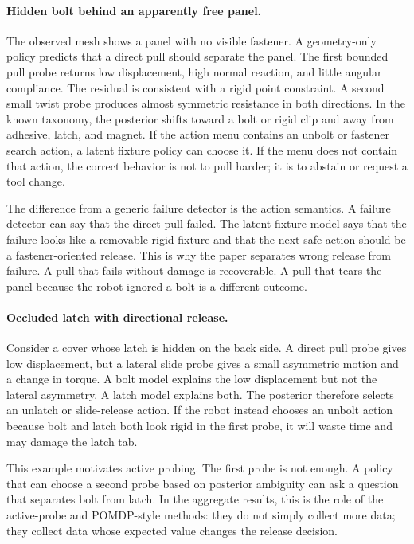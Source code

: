 \documentclass{article}
\begin{document}
\paragraph{Hidden bolt behind an apparently free panel.}
The observed mesh shows a panel with no visible fastener. A geometry-only
policy predicts that a direct pull should separate the panel. The first bounded
pull probe returns low displacement, high normal reaction, and little angular
compliance. The residual is consistent with a rigid point constraint. A second
small twist probe produces almost symmetric resistance in both directions. In
the known taxonomy, the posterior shifts toward a bolt or rigid clip and away
from adhesive, latch, and magnet. If the action menu contains an unbolt or
fastener search action, a latent fixture policy can choose it. If the menu does
not contain that action, the correct behavior is not to pull harder; it is to
abstain or request a tool change.

The difference from a generic failure detector is the action semantics. A
failure detector can say that the direct pull failed. The latent fixture model
says that the failure looks like a removable rigid fixture and that the next
safe action should be a fastener-oriented release. This is why the paper
separates wrong release from failure. A pull that fails without damage is
recoverable. A pull that tears the panel because the robot ignored a bolt is a
different outcome.

\paragraph{Occluded latch with directional release.}
Consider a cover whose latch is hidden on the back side. A direct pull probe
gives low displacement, but a lateral slide probe gives a small asymmetric
motion and a change in torque. A bolt model explains the low displacement but
not the lateral asymmetry. A latch model explains both. The posterior therefore
selects an unlatch or slide-release action. If the robot instead chooses an
unbolt action because bolt and latch both look rigid in the first probe, it
will waste time and may damage the latch tab.

This example motivates active probing. The first probe is not enough. A policy
that can choose a second probe based on posterior ambiguity can ask a question
that separates bolt from latch. In the aggregate results, this is the role of
the active-probe and POMDP-style methods: they do not simply collect more data;
they collect data whose expected value changes the release decision.
\end{document}
